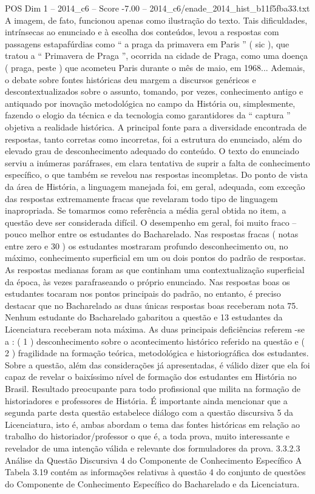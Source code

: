 \begin{textsample}{POS Dim 1 – 2014\_c6 – Score -7.00 – 2014\_c6/enade\_2014\_hist\_b11f5fba33.txt}
A imagem, de fato, funcionou apenas como ilustração do texto.
Tais dificuldades, intrínsecas ao enunciado e à escolha dos conteúdos, levou a respostas com passagens estapafúrdias como “ a praga da primavera em Paris ” ( sic ), que tratou a “ Primavera de Praga ”, ocorrida na cidade de Praga, como uma doença ( praga, peste ) que acometeu Paris durante o mês de maio, em 1968...
Ademais, o debate sobre fontes históricas deu margem a discursos genéricos e descontextualizados sobre o assunto, tomando, por vezes, conhecimento antigo e antiquado por inovação metodológica no campo da História ou, simplesmente, fazendo o elogio da técnica e da tecnologia como garantidores da “ captura ” objetiva a realidade histórica.
A principal fonte para a diversidade encontrada de respostas, tanto corretas como incorretas, foi a estrutura do enunciado, além do elevado grau de desconhecimento adequado do conteúdo.
O texto do enunciado serviu a inúmeras paráfrases, em clara tentativa de suprir a falta de conhecimento específico, o que também se revelou nas respostas incompletas.
Do ponto de vista da área de História, a linguagem manejada foi, em geral, adequada, com exceção das respostas extremamente fracas que revelaram todo tipo de linguagem inapropriada.
Se tomarmos como referência a média geral obtida no item, a questão deve ser considerada difícil.
O desempenho em geral, foi muito fraco – pouco melhor entre os estudantes do Bacharelado.
Nas respostas fracas ( notas entre zero e 30 ) os estudantes mostraram profundo desconhecimento ou, no máximo, conhecimento superficial em um ou dois pontos do padrão de respostas.
As respostas medianas foram as que continham uma contextualização superficial da época, às vezes parafraseando o próprio enunciado.
Nas respostas boas os estudantes tocaram nos pontos principais do padrão, no entanto, é preciso destacar que no Bacharelado as duas únicas respostas boas receberam nota 75.
Nenhum estudante do Bacharelado gabaritou a questão e 13 estudantes da Licenciatura receberam nota máxima.
As duas principais deficiências referem -se a : ( 1 ) desconhecimento sobre o acontecimento histórico referido na questão e ( 2 ) fragilidade na formação teórica, metodológica e historiográfica dos estudantes.
Sobre a questão, além das considerações já apresentadas, é válido dizer que ela foi capaz de revelar o baixíssimo nível de formação dos estudantes em História no Brasil.
Resultado preocupante para todo profissional que milita na formação de historiadores e professores de História.
É importante ainda mencionar que a segunda parte desta questão estabelece diálogo com a questão discursiva 5 da Licenciatura, isto é, ambas abordam o tema das fontes históricas em relação ao trabalho do historiador/professor o que é, a toda prova, muito interessante e revelador de uma intenção válida e relevante dos formuladores da prova. 3.3.2.3 Análise da Questão Discursiva 4 do Componente de Conhecimento Específico A Tabela 3.19 contém as informações relativas à questão 4 do conjunto de questões do Componente de Conhecimento Específico do Bacharelado e da Licenciatura.

\end{textsample}
